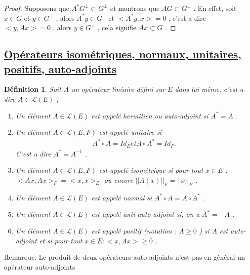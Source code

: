 \documentclass{report}
\newtheorem{Def}{Définition}[subsection]
\begin{document}
{\begin{proof}
\fbox{ $(\Leftarrow)$} Supposons que $A^* G^{\bot} \subset G^{\bot}$ et montrons que $A G \subset G^{\bot}$ . En effet, soit $x \in G$ et $y \in G^{\bot}$ , alors $A^* y \in G^{\bot}$ et $< A^*y,x > = 0$ , c'est-a-dire $< y,Ax > = 0$ , alors $y \in G^{\bot}$ , cela signifie $A x \subset G$ .
\end{proof}
 

\subsection{\underline{Opérateurs isométriques, normaux, unitaires, positifs, auto-adjoints}}

\begin{Def} Soit $A$ un opérateur linéaire défini sur $E$ dans lui même, c'est-a-dire $A \in \mathscr{L}(E)$ , \\
\begin{enumerate}[1)]
\item Un élément $A \in \mathscr{L}(E)$ est appelé hermitien ou auto-adjoint si $A^* = A$ .\\
\item Un élément $A \in \mathscr{L}(E,F)$ est appelé unitaire si 
		\begin{align*}
			 A^* \circ A = Id_E et A \circ A^* = Id_F .
		\end{align*}
	C'est a dire $A^* = A^{-1}$ .\\
\item Un élément $A \in \mathscr{L}(E, F)$ est appelé isométrique si pour tout $x \in E$ : $< Ax,Ax >_F = < x,x >_E$ ou encore $||A(x)||_F = ||x||_E$ .\\
\item Un élément $A \in \mathscr{L}(E)$ est appelé normal si $A^* \circ A = A \circ A^*$ .\\


\item Un élément $A \in \mathscr{L}(E)$ est appelé anti-auto-adjoint si, on a $A^* = - A$ .\\
\item Un élément $A \in \mathscr{L}(E)$ est appelé positif (notation : $A \ge 0$ ) si $A$ est auto-adjoint et si pour tout $x \in E : < x,Ax > \ge 0$ .
\end{enumerate}
\end{Def}

Remarque. Le produit de deux opérateurs auto-adjoints n'est pas en général un opérateur auto-adjoints \\

}
\end{document}
